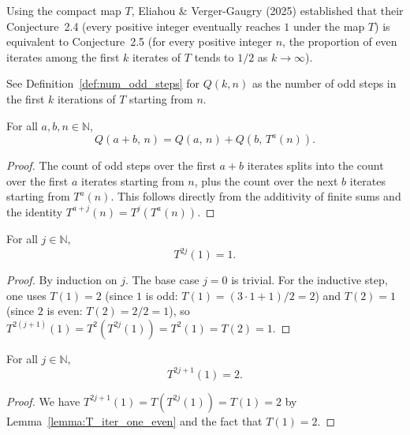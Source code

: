 \label{sec:uniform_distribution_correspondence}

Using the compact map $T$, Eliahou \& Verger-Gaugry (2025)\cite{eli25}
established that their Conjecture~2.4 (every positive integer
eventually reaches $1$ under the map $T$) is equivalent to Conjecture~2.5 (for every
positive integer $n$, the proportion of even iterates among the first $k$ iterates of $T$
tends to $1/2$ as $k \to \infty$).

See Definition~\ref{def:num_odd_steps} for $Q(k,n)$ as the number of odd steps in the first $k$
iterations of $T$ starting from $n$.


\begin{lemma}\label{lemma:num_odd_steps_split}\leanok
For all $a, b, n \in \mathbb{N}$,
\[
  Q(a + b,\, n)
  = Q(a,\, n)
    + Q(b,\, T^a(n)).
\]
\end{lemma}
\begin{proof}\leanok
The count of odd steps over the first $a+b$ iterates splits into the count over the first $a$ iterates starting from $n$, plus the count over the next $b$ iterates starting from $T^a(n)$.
This follows directly from the additivity of finite sums and the identity $T^{a+j}(n) = T^j(T^a(n))$.
\end{proof}

\begin{lemma}\label{lemma:T_iter_one_even}\leanok
For all $j \in \mathbb{N}$,
\[
  T^{2j}(1) = 1.
\]
\end{lemma}
\begin{proof}\leanok
By induction on $j$. The base case $j = 0$ is trivial. For the inductive step, one uses $T(1) = 2$ (since $1$ is odd: $T(1) = (3 \cdot 1 + 1)/2 = 2$) and $T(2) = 1$ (since $2$ is even: $T(2) = 2/2 = 1$), so $T^{2(j+1)}(1) = T^2(T^{2j}(1)) = T^2(1) = T(2) = 1$.
\end{proof}

\begin{lemma}\label{lemma:T_iter_one_odd}\leanok
For all $j \in \mathbb{N}$,
\[
  T^{2j+1}(1) = 2.
\]
\end{lemma}
\begin{proof}\leanok
We have $T^{2j+1}(1) = T(T^{2j}(1)) = T(1) = 2$ by Lemma~\ref{lemma:T_iter_one_even} and the fact that $T(1) = 2$.
\end{proof}

